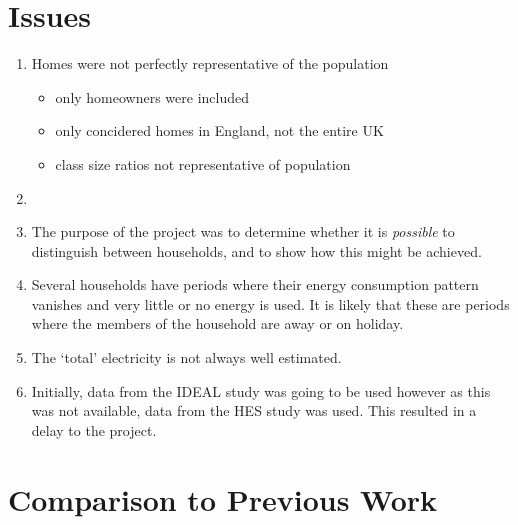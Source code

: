 \section{Issues}
\begin{enumerate}
\item Homes were not perfectly representative of the population
\begin{itemize}
	\item only homeowners were included
	\item only concidered homes in England, not the entire UK
	\item class size ratios not representative of population
\end{itemize} 
\item 
\item The purpose of the project was to determine whether it is \textit{possible} to distinguish between households, and to show how this might be achieved.  
\item Several households have periods where their energy consumption pattern vanishes and very little or no energy is used. It is likely that these are periods where the members of the household are away or on holiday.
\item The `total' electricity is not always well estimated. 
\item Initially, data from the IDEAL study was going to be used however as this was not available, data from the HES study was used. This resulted in a delay to the project.
\end{enumerate}

\section{Comparison to Previous Work}







